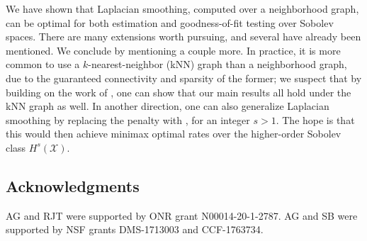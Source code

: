 \documentclass[twoside]{article}
\newcommand{\1}{\mathbf{1}}
\newcommand{\Xset}{\mathcal{X}}
\theoremstyle{definition}
\theoremstyle{remark}
\begin{document}
We have shown that Laplacian smoothing, computed over a neighborhood graph, can be optimal for both estimation and goodness-of-fit testing over Sobolev spaces. There are many extensions worth pursuing, and several have already been mentioned. We conclude by mentioning a couple more. In practice, it is more common to use a $k$-nearest-neighbor (kNN) graph than a neighborhood graph, due to the guaranteed connectivity and sparsity of the former; we suspect that by building on the work of \citet{calder2019}, one can show that our main results all hold under the kNN graph as well. In another direction, one can also generalize Laplacian smoothing by replacing the penalty  with , for an integer $s > 1$. The hope is that this would then achieve minimax optimal rates over the higher-order Sobolev class $H^s(\Xset)$. %

\subsection*{Acknowledgments}
AG and RJT were supported by ONR grant N00014-20-1-2787. AG and SB were supported by NSF grants DMS-1713003 and CCF-1763734.


 
\end{document}
